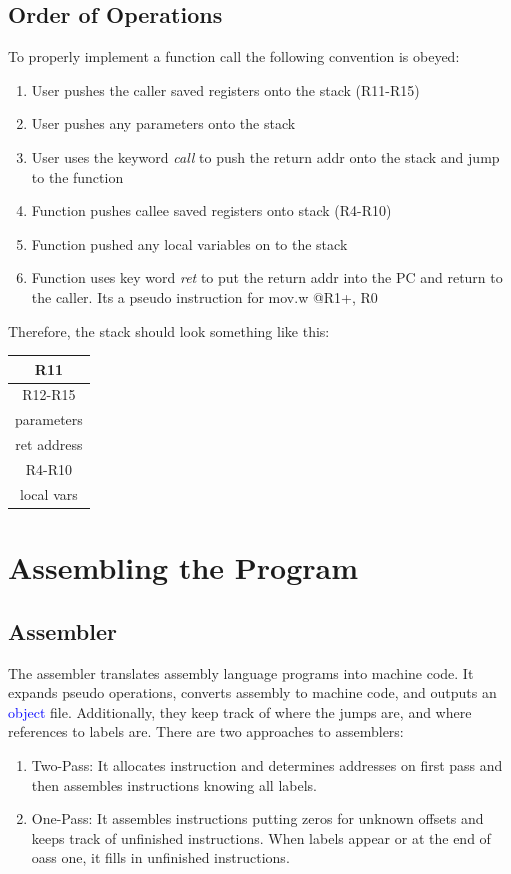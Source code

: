 \documentclass{hw}
\begin{document}
\subsection{Order of Operations}
To properly implement a function call the following convention is obeyed:
\begin{enumerate}
  \item User pushes the caller saved registers onto the stack (R11-R15)
  \item User pushes any parameters onto the stack
  \item User uses the keyword \emph{call} to push the return addr onto the stack and jump
  to the function
  \item Function pushes callee saved registers onto stack (R4-R10)
  \item Function pushed any local variables on to the stack
  \item Function uses key word \emph{ret} to put the return addr into the PC and
    return to the caller. Its a pseudo instruction for mov.w @R1+, R0
\end{enumerate}
Therefore, the stack should look something like this:
\begin{table}[h]
\centering
\begin{tabular}{|c|}
  \hline
  R11  \\\hline
  R12-R15  \\\hline
  parameters  \\\hline
  ret address  \\\hline
  R4-R10  \\\hline
  local vars  \\\hline
\end{tabular}
\end{table}


\section{Assembling the Program}
\subsection{Assembler}
The assembler translates assembly language programs into machine code. It expands
pseudo operations, converts assembly to machine code, and outputs an 
\textcolor{blue}{object} file. Additionally, they keep track of where the jumps are,
and where references to labels are. There are two approaches to assemblers:
\begin{enumerate}
  \item Two-Pass: It allocates instruction and determines addresses on first pass
    and then assembles instructions knowing all labels.
  \item One-Pass: It assembles instructions putting zeros for unknown offsets and
    keeps track of unfinished instructions. When labels appear or at the end of
    oass one, it fills in unfinished instructions.
\end{enumerate}
\end{document}
